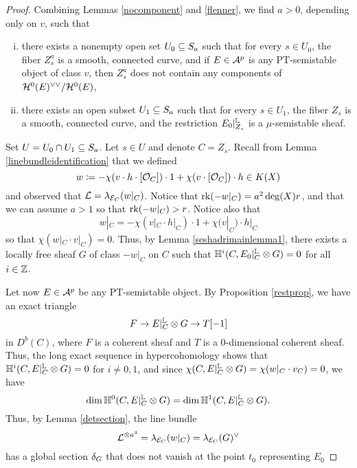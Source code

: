 \begin{proof}
    Combining Lemmas \ref{nocomponent} and \ref{flenner}, we find $a > 0$, depending only on $v$, such that
    \begin{enumerate}[(i)]
        \item there exists a nonempty open set $U_0 \subseteq S_a$ such that for every $s \in U_0$, the fiber $Z^a_s$ is a smooth, connected curve, and if $E \in \mathcal{A}^p$ is any PT-semistable object of class $v$, then $Z^a_s$ does not contain any components of $\mathcal{H}^0(E)^{\vee\vee}/\mathcal{H}^0(E)$,
        \item there exists an open subset $U_1 \subseteq S_a$ such that for every $s \in U_1$, the fiber $Z_s$ is a smooth, connected curve, and the restriction $E_0|^{\mathbb{L}}_{Z_s}$ is a $\mu$-semistable sheaf.
    \end{enumerate}
    Set $U = U_0 \cap U_1 \subseteq S_a$. Let $s \in U$ and denote $C = Z_s$. Recall from Lemma \ref{linebundleidentification} that we defined
    \[ w \coloneqq -\chi(v \cdot h \cdot [\mathcal{O}_C]) \cdot 1 + \chi(v \cdot [\mathcal{O}_C]) \cdot h \in K(X) \]
    and observed that $\mathcal{L} = \lambda_{\mathcal{E}_C}(w|_C)$. Notice that $\operatorname{\mathrm{rk}}(-w|_C) = a^2 \deg(X) r$, and that we can assume $a > 1$ so that $\operatorname{\mathrm{rk}}(-w|_C) > r$. Notice also that
    \[ w|_C = -\chi(v|_C \cdot h|_C) \cdot 1 + \chi(v|_C) \cdot h|_C \]
    so that $\chi(w|_C \cdot v|_C) = 0$. Thus, by Lemma \ref{seshadrimainlemma1}, there exists a locally free sheaf $G$ of class $-w|_C$ on $C$ such that $\mathbb{H}^i(C, E_0|^{\mathbb{L}}_C \otimes G) = 0$ for all $i \in \mathbb{Z}$.
    
    Let now $E \in \mathcal{A}^p$ be any PT-semistable object. By Proposition \ref{restprop}, we have an exact triangle
    \[ F \to E|^{\mathbb{L}}_C \otimes G \to T[-1] \]
    in $D^b(C)$, where $F$ is a coherent sheaf and $T$ is a 0-dimensional coherent sheaf. Thus, the long exact sequence in hypercohomology shows that $\mathbb{H}^i(C, E|^{\mathbb{L}}_C \otimes G) = 0$ for $i \neq 0, 1$, and since $\chi(C, E|^{\mathbb{L}}_C \otimes G) = \chi(w|_C \cdot v_C) = 0$, we have
    \[ \dim \mathbb{H}^0(C, E|^{\mathbb{L}}_C \otimes G) = \dim \mathbb{H}^1(C, E|^{\mathbb{L}}_C \otimes G). \]
    Thus, by Lemma \ref{detsection}, the line bundle
    \[ \mathcal{L}^{\otimes a^4} = \lambda_{\mathcal{E}_C}(w|_C) = \lambda_{\mathcal{E}_C}(G)^\vee \]
    has a global section $\delta_G$ that does not vanish at the point $t_0$ representing $E_0$
\end{proof}

